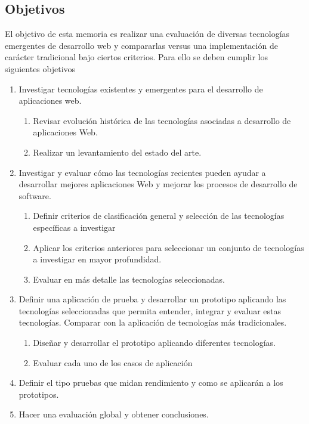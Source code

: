 \subsection{Objetivos}
El objetivo de esta memoria es realizar una evaluación de diversas tecnologías emergentes de desarrollo web
y compararlas versus una implementación de carácter tradicional bajo ciertos criterios. Para ello se deben cumplir
los siguientes objetivos

\begin{enumerate}
 \item Investigar tecnologías existentes y emergentes para el desarrollo de aplicaciones web.
 \begin{enumerate}
   \item  Revisar evolución histórica de las tecnologías asociadas a desarrollo de aplicaciones Web.
   \item  Realizar un levantamiento del estado del arte.
 \end{enumerate}
 \item Investigar y evaluar cómo las tecnologías recientes pueden ayudar a desarrollar mejores aplicaciones 
	Web y  mejorar los procesos de desarrollo de software.
 \begin{enumerate}
   \item Definir criterios de clasificación general y selección de las tecnologías específicas a investigar
   \item Aplicar los criterios anteriores para seleccionar un conjunto de tecnologías a investigar en mayor profundidad.
   \item Evaluar en más detalle las tecnologías seleccionadas.
 \end{enumerate}
 \item Definir una aplicación de prueba y desarrollar un prototipo aplicando las tecnologías seleccionadas que permita 
	entender, integrar y evaluar estas tecnologías. Comparar con la aplicación de tecnologías más tradicionales.
 \begin{enumerate}
   \item Diseñar y desarrollar el prototipo aplicando diferentes tecnologías.
   \item Evaluar cada uno de los casos de aplicación
 \end{enumerate}
 \item Definir el tipo pruebas que midan rendimiento y como se aplicarán a los prototipos. 
 \item Hacer una evaluación global y obtener conclusiones.
\end{enumerate}


